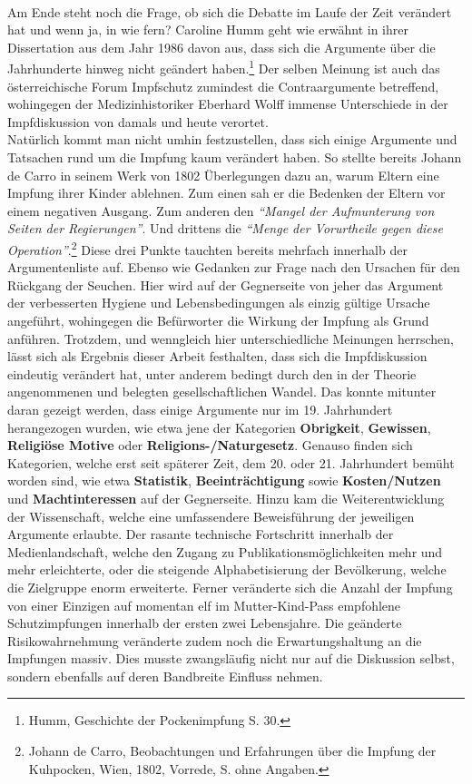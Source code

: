 \documentclass[
    a4paper,
    12pt,
    hyphens,
    chapterprefix=true,
    headheight=33pt,
    footheight=29pt,
    headings=optiontohead, %
]{scrartcl}
\begin{document}
{\\
Am Ende steht noch die Frage, ob sich die Debatte im Laufe der Zeit verändert hat und wenn ja, in wie fern? Caroline Humm geht wie erwähnt in ihrer Dissertation aus dem Jahr 1986 davon aus, dass sich die Argumente über die Jahrhunderte hinweg nicht geändert haben.\footnote{Humm, Geschichte der Pockenimpfung S. 30.} Der selben Meinung ist auch das österreichische Forum Impfschutz zumindest die Contraargumente betreffend, wohingegen der Medizinhistoriker Eberhard Wolff immense Unterschiede in der Impfdiskussion von damals und heute verortet.\\
Natürlich kommt man nicht umhin festzustellen, dass sich einige Argumente und Tatsachen rund um die Impfung kaum verändert haben. So stellte bereits Johann de Carro in seinem Werk von 1802 Überlegungen dazu an, warum Eltern eine Impfung ihrer Kinder ablehnen. Zum einen sah er die Bedenken der Eltern vor einem negativen Ausgang. Zum anderen den \textit{"`Mangel der Aufmunterung von Seiten der Regierungen"'}. Und drittens die \textit{"`Menge der Vorurtheile gegen diese Operation"'}.\footnote{Johann de Carro, Beobachtungen und Erfahrungen über die Impfung der Kuhpocken, Wien, 1802, Vorrede, S. ohne Angaben.} Diese drei Punkte tauchten bereits mehrfach innerhalb der Argumentenliste auf. Ebenso wie Gedanken zur Frage nach den Ursachen für den Rückgang der Seuchen. Hier wird auf der Gegnerseite von jeher das Argument der verbesserten Hygiene und Lebensbedingungen als einzig gültige Ursache angeführt, wohingegen die Befürworter die Wirkung der Impfung als Grund anführen. Trotzdem, und wenngleich hier unterschiedliche Meinungen herrschen, lässt sich als Ergebnis dieser Arbeit festhalten, dass sich die Impfdiskussion eindeutig verändert hat, unter anderem bedingt durch den in der Theorie angenommenen und belegten gesellschaftlichen Wandel. Das konnte mitunter daran gezeigt werden, dass einige Argumente nur im 19. Jahrhundert herangezogen wurden, wie etwa jene der Kategorien \textbf{Obrigkeit}, \textbf{Gewissen}, \textbf{Religiöse Motive} oder \textbf{Religions-/Naturgesetz}.
Genauso finden sich Kategorien, welche erst seit späterer Zeit, dem 20. oder 21. Jahrhundert bemüht worden sind, wie etwa \textbf{Statistik}, \textbf{Beeinträchtigung} sowie \textbf{Kosten/Nutzen} und \textbf{Machtinteressen} auf der Gegnerseite. Hinzu kam die Weiterentwicklung der Wissenschaft, welche eine umfassendere Beweisführung der jeweiligen Argumente erlaubte. Der rasante technische Fortschritt innerhalb der Medienlandschaft, welche den Zugang zu Publikationsmöglichkeiten mehr und mehr erleichterte, oder die steigende Alphabetisierung der Bevölkerung, welche die Zielgruppe enorm erweiterte. Ferner veränderte sich die Anzahl der Impfung von einer Einzigen auf momentan elf im Mutter-Kind-Pass empfohlene Schutzimpfungen innerhalb der ersten zwei Lebensjahre. Die geänderte Risikowahrnehmung veränderte zudem noch die Erwartungshaltung an die Impfungen massiv. Dies musste zwangsläufig nicht nur auf die Diskussion selbst, sondern ebenfalls auf deren Bandbreite Einfluss nehmen.









}
\end{document}
